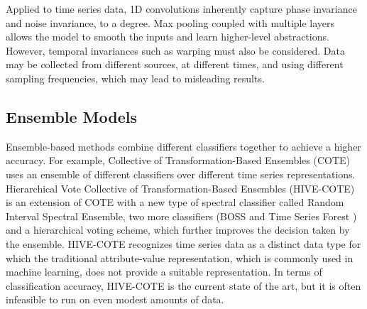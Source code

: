 \begin{remark}
    Applied to time series data, 1D convolutions inherently capture phase invariance and noise invariance, to a degree.
    Max pooling coupled with multiple layers allows the model to smooth the inputs and learn higher-level abstractions.
    However, temporal invariances such as warping must also be considered. Data may be collected from different sources, at different times, and using different sampling frequencies, which may lead to misleading results.
\end{remark}
    


\subsection{Ensemble Models}

Ensemble-based methods combine different classifiers together to achieve a higher accuracy. For example, Collective of Transformation-Based Ensembles (COTE) \cite{bagnall2015time} uses an ensemble of different classifiers over different time series representations.
Hierarchical Vote Collective of Transformation-Based Ensembles (HIVE-COTE) \cite{lines2018time} is an extension of COTE with a new type of spectral classifier called Random Interval Spectral Ensemble, two more classifiers (BOSS \cite{schafer2015boss} and Time Series Forest \cite{deng2013time}) and a hierarchical voting scheme, which further improves the decision taken by the ensemble.
HIVE-COTE recognizes time series data as a distinct data type for which the traditional attribute-value representation, which is commonly used in machine learning, does not provide a suitable representation.
In terms of classification accuracy, HIVE-COTE is the current state of the art, but it is often infeasible to run on even modest amounts of data. 


